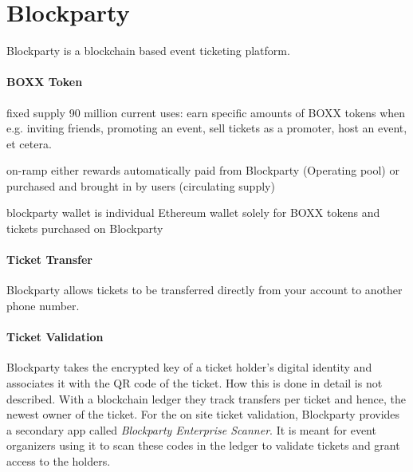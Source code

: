 
\section{Blockparty}

Blockparty \cite{blockparty-whitepaper} is a blockchain based event ticketing platform. 

\paragraph{BOXX Token} 
fixed supply 90 million
current uses: earn specific amounts of BOXX tokens when e.g. inviting friends, promoting an event, sell tickets as a promoter, host an event, et cetera.

on-ramp
either rewards automatically paid from Blockparty (Operating pool) or purchased and brought in by users (circulating supply)

blockparty wallet is individual Ethereum wallet solely for BOXX tokens and tickets purchased on Blockparty

\paragraph{Ticket Transfer} Blockparty allows tickets to be transferred directly from your account to another phone number.


\paragraph{Ticket Validation} Blockparty takes the encrypted key of a ticket holder's digital identity and associates it with the QR code of the ticket. How this is done in detail is not described. With a blockchain ledger they track transfers per ticket and hence, the newest owner of the ticket. For the on site ticket validation, Blockparty provides a secondary app called \textit{Blockparty Enterprise Scanner}. It is meant for event organizers using it to scan these codes in the ledger to validate tickets and grant access to the holders.